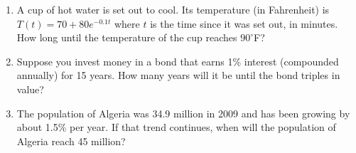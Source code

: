 \documentclass[10pt]{article}
\begin{document}
\noindent
\begin{enumerate}
\setcounter{enumi}{\theenumCount}

\newpage


\item A cup of hot water is set out to cool.  Its temperature (in Fahrenheit) is $T(t) = 70 + 80 e^{-0.1t}$ where $t$ is the time since it was set out, in minutes.  How long until the temperature of the cup reaches $90^\circ$F?   
\vfill 

\item Suppose you invest money in a bond that earns 1\% interest (compounded annually) for 15 years. How many years will it be until the bond triples in value?  
\vfill


\item The population of Algeria was 34.9 million in 2009 and has been growing by about 1.5\% per year.  If that trend continues, when will the population of Algeria reach 45 million?
\vfill




\setcounter{enumCount}{\theenumi}
\end{enumerate}
\end{document}
